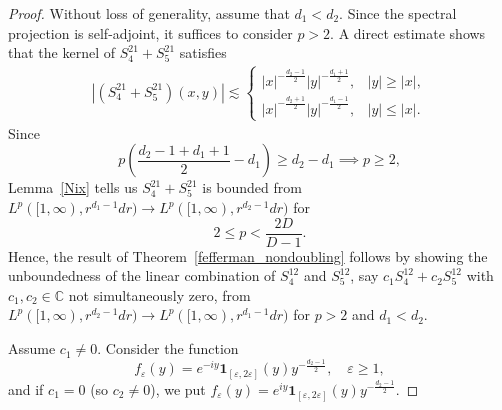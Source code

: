 \documentclass[12pt]{amsart}
\begin{document}
\begin{proof}
Without loss of generality, assume that \(d_1<d_2\).
Since the spectral projection is self-adjoint, it  suffices to
consider $p>2$.  A direct estimate shows  that the kernel of $S_4^{21}+S_{5}^{21}$
satisfies 
\begin{align*}
    |(S_4^{21}+S_{5}^{21})(x,y)| \lesssim \begin{cases}
        |x|^{-\frac{d_2-1}{2}} |y|^{-\frac{d_1+1}{2}}, & |y|\ge |x|,\\
        |x|^{-\frac{d_2+1}{2}} |y|^{-\frac{d_1-1}{2}}, & |y|\le |x|.
    \end{cases}
\end{align*}
Since 
\begin{equation*}
    p\left( \frac{d_2-1+d_1+1}{2} - d_1 \right) \ge d_2-d_1 \implies p\ge 2,
\end{equation*}
Lemma~\ref{Nix} tells us $S_4^{21}+S_{5}^{21}$ is bounded from $L^p([1,\infty), r^{d_1-1}dr) \to L^p([1,\infty), r^{d_2-1}dr)$ for 
\begin{equation*}
    2\le  p < \frac{2D}{D-1}.
\end{equation*}
Hence, the result of Theorem~\ref{fefferman_nondoubling} follows by showing the unboundedness of the linear combination of $S_4^{12}$ and $S_{5}^{12}$, say $c_1 S_4^{12} + c_2 S_5^{12}$ with $c_1,c_2 \in \mathbb C$ not simultaneously zero, from $L^p([1,\infty), r^{d_2-1}dr) \to L^p([1,\infty), r^{d_1-1}dr)$ for $p>2$ and $d_1<d_2$. 

Assume $c_1\ne 0$. Consider the function 
\begin{equation}\label{couterF}
    f_\varepsilon(y) = e^{-iy} \mathbf{1}_{[\varepsilon,2\varepsilon]}(y) y^{-\frac{d_2-1}{2}}, \quad \varepsilon\ge 1,
\end{equation}
and if $c_1=0$ (so $c_2\ne 0$), we put $f_\varepsilon(y) = e^{iy} \mathbf{1}_{[\varepsilon,2\varepsilon]}(y) y^{-\frac{d_2-1}{2}}$.


\end{proof}
\end{document}
